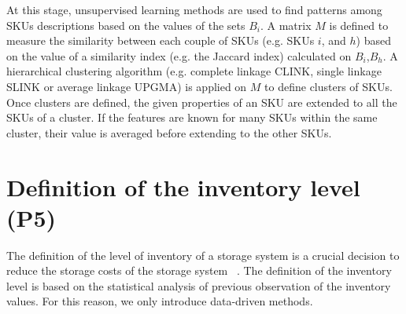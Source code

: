 At this stage, unsupervised learning methods are used to find patterns among SKUs descriptions based on the values of the sets $B_i$. A matrix $M$ is defined to measure the similarity between each couple of SKUs (e.g. SKUs $i$, and $h$) based on the value of a similarity index (e.g. the Jaccard index) calculated on $B_i$,$B_h$. A hierarchical clustering algorithm (e.g. complete linkage CLINK, single linkage SLINK or average linkage UPGMA) is applied on $M$ to define clusters of SKUs. Once clusters are defined, the given properties of an SKU are extended to all the SKUs of a cluster. If the features are known for many SKUs within the same cluster, their value is averaged before extending to the other SKUs.

\section{Definition of the inventory level (P5)} \label{secInventoryDesign}
The definition of the level of inventory of a storage system is a crucial decision to reduce the storage costs of the storage system ~\cite{Cormier1999,Cormier1992,Goh2001, Hung1984, Levy1974, Lowe1979, Rao1998, Rosenblatt1984, Rosenblatt1988, White1971}. The definition of the inventory level is based on the statistical analysis of previous observation of the inventory values. For this reason, we only introduce data-driven methods.


